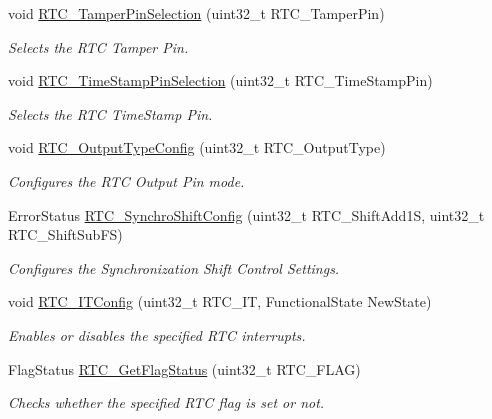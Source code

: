 \begin{DoxyCompactItemize}
void \hyperlink{group___r_t_c_ga46777272ae77eb9dc38610481e12b0ed}{R\-T\-C\-\_\-\-Tamper\-Pin\-Selection} (uint32\-\_\-t R\-T\-C\-\_\-\-Tamper\-Pin)
\begin{DoxyCompactList}\small\item\em Selects the R\-T\-C Tamper Pin. \end{DoxyCompactList}\item 
void \hyperlink{group___r_t_c_gaedf9830bdaaaa50ea5d45d2ff7bb43a9}{R\-T\-C\-\_\-\-Time\-Stamp\-Pin\-Selection} (uint32\-\_\-t R\-T\-C\-\_\-\-Time\-Stamp\-Pin)
\begin{DoxyCompactList}\small\item\em Selects the R\-T\-C Time\-Stamp Pin. \end{DoxyCompactList}\item 
void \hyperlink{group___r_t_c_ga95263b7acf7168d52f66ef9121f14760}{R\-T\-C\-\_\-\-Output\-Type\-Config} (uint32\-\_\-t R\-T\-C\-\_\-\-Output\-Type)
\begin{DoxyCompactList}\small\item\em Configures the R\-T\-C Output Pin mode. \end{DoxyCompactList}\item 
Error\-Status \hyperlink{group___r_t_c_gaad434ed2a268f05662f0613e8e9717f3}{R\-T\-C\-\_\-\-Synchro\-Shift\-Config} (uint32\-\_\-t R\-T\-C\-\_\-\-Shift\-Add1\-S, uint32\-\_\-t R\-T\-C\-\_\-\-Shift\-Sub\-F\-S)
\begin{DoxyCompactList}\small\item\em Configures the Synchronization Shift Control Settings. \end{DoxyCompactList}\item 
void \hyperlink{group___r_t_c_gaa8469b33b3a99025baf52f007683b925}{R\-T\-C\-\_\-\-I\-T\-Config} (uint32\-\_\-t R\-T\-C\-\_\-\-I\-T, Functional\-State New\-State)
\begin{DoxyCompactList}\small\item\em Enables or disables the specified R\-T\-C interrupts. \end{DoxyCompactList}\item 
Flag\-Status \hyperlink{group___r_t_c_gaf2a7f11aa7160e95650fd10845e7780b}{R\-T\-C\-\_\-\-Get\-Flag\-Status} (uint32\-\_\-t R\-T\-C\-\_\-\-F\-L\-A\-G)
\begin{DoxyCompactList}\small\item\em Checks whether the specified R\-T\-C flag is set or not. \end{DoxyCompactList}\item 

\end{DoxyCompactItemize}
